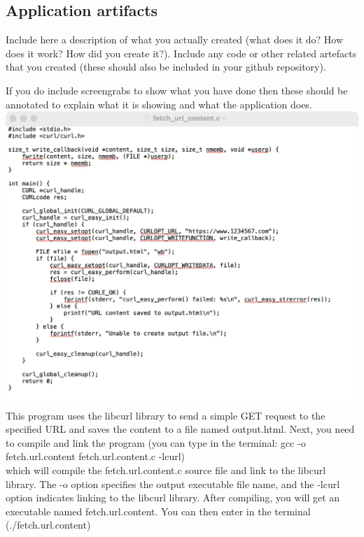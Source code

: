 \documentclass[a4paper, 11pt]{report}
\begin{document}
\subsection{Application artifacts}
Include here a description of what you actually created (what does it do? How does it work? How did you create it?). Include any code or other related artefacts that you created (these should also be included in your github repository).

If you do include screengrabs to show what you have done then these should be annotated to explain what it is showing and what the application does.\\

\includegraphics[width=1\linewidth]{fetch.url.content.jpeg}\\

This program uses the libcurl library to send a simple GET request to the specified URL and saves the content to a file named output.html. Next, you need to compile and link the program (you can type in the terminal: gcc -o fetch.url.content fetch.url.content.c -lcurl)\\

which will compile the fetch.url.content.c source file and link to the libcurl library. The -o option specifies the output executable file name, and the -lcurl option indicates linking to the libcurl library. After compiling, you will get an executable named fetch.url.content. You can then enter in the terminal (./fetch.url.content) \\
\end{document}
